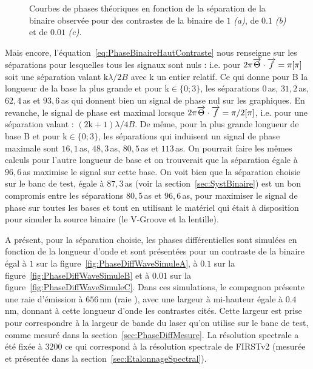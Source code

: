 \begin{figure}[ht!]
\begin{subfigure}{0.5\textwidth}
        \caption{}
        \label{fig:PhaseDiffBinSizeSimuleC}
    \end{subfigure}
    \caption[Courbes de phases théoriques en fonction de la séparation de la binaire observée.]{Courbes de phases théoriques en fonction de la séparation de la binaire observée pour des contrastes de la binaire de $1$ \textit{(a)}, de $0.1$ \textit{(b)} et de $0.01$ \textit{(c)}.}
    \label{fig:PhaseDiffBinSizeSimule}
\end{figure}

Mais encore, l'équation~\ref{eq:PhaseBinaireHautContraste} nous renseigne sur les séparations pour lesquelles tous les signaux sont nuls : i.e. pour $2\pi \overrightarrow{\Theta} \cdot \overrightarrow{f} = \pi [\pi]$ soit une séparation valant $\text{k} \lambda / 2B$ avec k un entier relatif. Ce qui donne pour B la longueur de la base la plus grande et pour $\text{k} \in \{0; 3\}$, les séparations $0 \,$as, $31,2 \,$as, $62,4 \,$as et $93,6 \,$as qui donnent bien un signal de phase nul sur les graphiques. En revanche, le signal de phase est maximal lorsque $2\pi \overrightarrow{\Theta} \cdot \overrightarrow{f} = \pi / 2 [\pi]$, i.e. pour une séparation valant : $(2\text{k}+1) \lambda / 4B$. De même, pour la plus grande longueur de base B et pour $\text{k} \in \{0; 3\}$, les séparations qui induisent un signal de phase maximale sont $16,1 \,$as, $48,3 \,$as, $80,5 \,$as et $113 \,$as. On pourrait faire les mêmes calculs pour l'autre longueur de base et on trouverait que la séparation égale à $96,6 \,$as maximise le signal sur cette base. On voit bien que la séparation choisie sur le banc de test, égale à $87,3 \, $as (voir la section~\ref{sec:SystBinaire}) est un bon compromis entre les séparations $80,5 \,$as et $96,6 \,$as, pour maximiser le signal de phase sur toutes les bases et tout en utilisant le matériel qui était à disposition pour simuler la source binaire (le V-Groove et la lentille).

A présent, pour la séparation choisie, les phases différentielles sont simulées en fonction de la longueur d'onde et sont présentées pour un contraste de la binaire égal à $1$ sur la figure~\ref{fig:PhaseDiffWaveSimuleA}, à $0.1$ sur la figure~\ref{fig:PhaseDiffWaveSimuleB} et à $0.01$ sur la figure~\ref{fig:PhaseDiffWaveSimuleC}. Dans ces simulations, le compagnon présente une raie d'émission à $656 \,$nm (raie \ha), avec une largeur à mi-hauteur égale à $0.4 \,$nm, donnant à cette longueur d'onde les contrastes cités. Cette largeur est prise pour correspondre à la largeur de bande du laser qu'on utilise sur le banc de test, comme mesuré dans la section~\ref{sec:PhaseDiffMesure}. La résolution spectrale a été fixée à $3200$ ce qui correspond à la résolution spectrale de \ac{FIRSTv2} (mesurée et présentée dans la section~\ref{sec:EtalonnageSpectral}).

